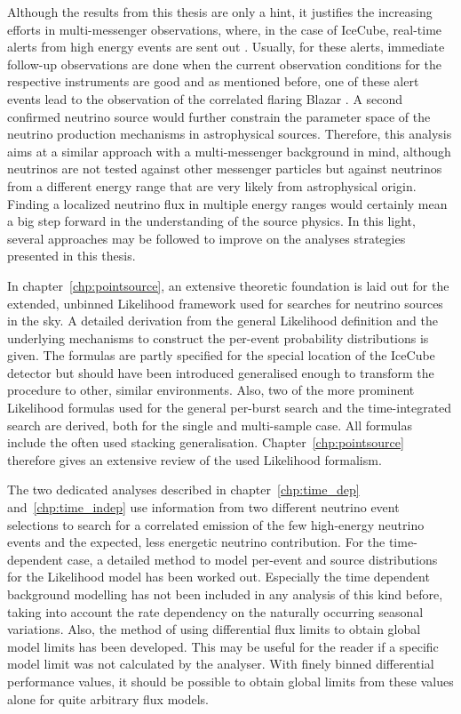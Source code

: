 Although the results from this thesis are only a hint, it justifies the increasing efforts in multi-messenger observations, where, in the case of IceCube, real-time alerts from high energy events are sent out \cite{Aartsen:2016lmt}.
Usually, for these alerts, immediate follow-up observations are done when the current observation conditions for the respective instruments are good \cite{DeLotto:2017ggz} and as mentioned before, one of these alert events lead to the observation of the correlated flaring Blazar \cite{IceCube:2018cha}.
A second confirmed neutrino source would further constrain the parameter space of the neutrino production mechanisms in astrophysical sources.
Therefore, this analysis aims at a similar approach with a multi-messenger background in mind, although neutrinos are not tested against other messenger particles but against neutrinos from a different energy range that are very likely from astrophysical origin.
Finding a localized neutrino flux in multiple energy ranges would certainly mean a big step forward in the understanding of the source physics.
In this light, several approaches may be followed to improve on the analyses strategies presented in this thesis.

In chapter~\ref{chp:pointsource}, an extensive theoretic foundation is laid out for the extended, unbinned Likelihood framework used for searches for neutrino sources in the sky.
A detailed derivation from the general Likelihood definition and the underlying mechanisms to construct the per-event probability distributions is given.
The formulas are partly specified for the special location of the IceCube detector but should have been introduced generalised enough to transform the procedure to other, similar environments.
Also, two of the more prominent Likelihood formulas used for the general per-burst search and the time-integrated search are derived, both for the single and multi-sample case.
All formulas include the often used stacking generalisation.
Chapter~\ref{chp:pointsource} therefore gives an extensive review of the used Likelihood formalism.

The two dedicated analyses described in chapter~\ref{chp:time_dep} and~\ref{chp:time_indep} use information from two different neutrino event selections to search for a correlated emission of the few high-energy neutrino events and the expected, less energetic neutrino contribution.
For the time-dependent case, a detailed method to model per-event and source distributions for the Likelihood model has been worked out.
Especially the time dependent background modelling has not been included in any analysis of this kind before, taking into account the rate dependency on the naturally occurring seasonal variations.
Also, the method of using differential flux limits to obtain global model limits has been developed.
This may be useful for the reader if a specific model limit was not calculated by the analyser.
With finely binned differential performance values, it should be possible to obtain global limits from these values alone for quite arbitrary flux models.

